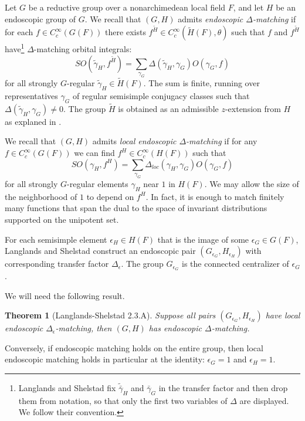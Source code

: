 \documentclass[12pt]{amsart}
\theoremstyle{plain}
\newtheorem{theorem}[thm]{Theorem}
\theoremstyle{definition}
\begin{document}
Let $G$ be a reductive group over a nonarchimedean local field $F$,
and let $H$ be an endoscopic group of $G$.  We recall
\cite[Sec.2.1]{LSd} that $(G,H)$ admits {\it endoscopic
  $\Delta$-matching} if for each $f\in C_c^\infty(G(F))$ there exists
$f^{\tilde H}\in C_c^\infty(\tilde H(F),\theta)$ such that $f$
and $f^{\tilde H}$ have\footnote{Langlands and Shelstad fix
  $\tilde{\bar \gamma}_H$ and $\bar\gamma_G$ in the transfer factor
  and then drop them from notation, so that only the first two
  variables of $\Delta$ are displayed.  We follow their convention.}  $\Delta$-matching orbital
integrals:
\[
SO(\tilde \gamma_H,f^{\tilde H}) 
 = \sum_{\gamma_G} \Delta(\tilde\gamma_H,\gamma_G)O(\gamma_G,f)
\]
for all strongly $G$-regular $\tilde \gamma_H \in \tilde H(F)$.  The
sum is finite, running over representatives $\gamma_G$ of regular
semisimple conjugacy classes such that
$\Delta(\tilde\gamma_H,\gamma_G)\ne0$.  The group $\tilde H$ is
obtained as an admissible $z$-extension from $H$ as explaned in
\cite[Sec. 4.4]{LSxf}.

We recall that $(G,H)$ admits {\it local endoscopic $\Delta$-matching}
if for any $f\in C_c^\infty(G(F))$ we can find $f^H \in C_c^\infty(H(F))$
such that
\[
SO( \gamma_H,f^{ H}) 
 = \sum_{\gamma_G} \Delta_{loc}(\gamma_H,\gamma_G)O(\gamma_G,f)
\]
for all strongly $G$-regular elements $\gamma_H$ near $1$ in $H(F)$.
We may allow the size of the neighborhood of $1$ to depend on $f^H$.
In fact, it is enough to match finitely many functions that span the
dual to the space of invariant distributions supported on the
unipotent set.

For each semisimple element $\epsilon_H \in H(F)$ that is the image of
some $\epsilon_G\in G(F)$, Langlands and Shelstad construct an
endoscopic pair $(G_{\epsilon_G},H_{\epsilon_H})$ with corresponding
transfer factor $\Delta_\epsilon$.  The group $G_{\epsilon_G}$ is the
connected centralizer of $\epsilon_G$.

We will need the following result.

\begin{theorem}[Langlands-Shelstad 2.3.A]  Suppose all pairs
  $(G_{\epsilon_G},H_{\epsilon_H})$ have local endoscopic
  $\Delta_\epsilon$-matching, then $(G,H)$ has endoscopic $\Delta$-matching.
\end{theorem}

Conversely, if endoscopic matching holds on the entire group, then
local endoscopic matching holds in particular at the identity:
$\epsilon_G = 1$ and $\epsilon_H =1$.
\end{document}
